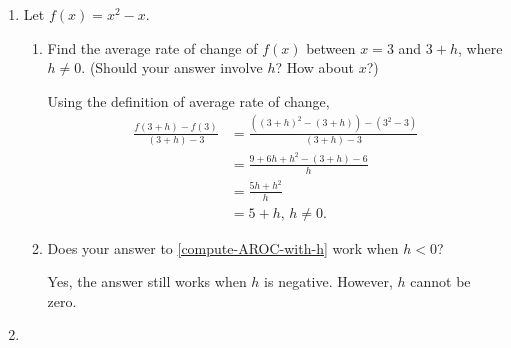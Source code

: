 \documentclass{article}
\begin{document}
\begin{enumerate}
\begin{enumerate}[resume]
  \end{enumerate}

  \item 

  Let $f(x) = x^2 - x$.

  \begin{enumerate}
  \item \label{compute-AROC-with-h}
    \begin{problem}[\stretch{1.5}]
      Find the average rate of change of $f(x)$ between $x = 3$ and $3 + h$, where $h \neq 0$. (Should your answer involve $h$? How about $x$?) 
    \end{problem}

    \begin{solution}
      Using the definition of average rate of change,
      \begin{align*}
        \frac{f(3+h)-f(3)}{(3+h) - 3} &= \frac{\left((3+h)^2 - (3+h)\right) - \left(3^2 - 3\right)}{(3+h)-3} \\[2pt]
        &= \frac{9+6h+h^2 - (3+h) - 6}{h} \\[2pt]
        &= \frac{5h + h^2}{h} \\[2pt]
        &= 5 + h,\, h \neq 0.
      \end{align*}
    \end{solution}

  \item
    \begin{problem}[\nstretch{0.5}]
      Does your answer to \ref{compute-AROC-with-h} work when $h < 0$? 
    \end{problem}

    \begin{solution}
        Yes, the answer still works when $h$ is negative. However, $h$ cannot be zero.
    \end{solution}

  \end{enumerate}

\item 



\end{enumerate}
\end{document}
